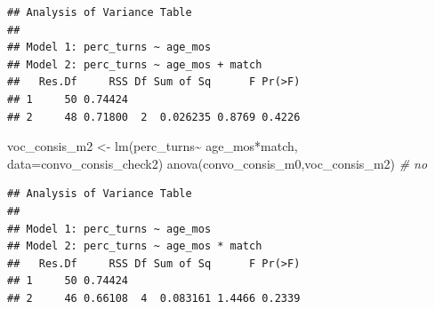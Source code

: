 \documentclass[
]{article}
\newenvironment{Shaded}{\begin{snugshade}}{\end{snugshade}}
\newcommand{\AttributeTok}[1]{\textcolor[rgb]{0.77,0.63,0.00}{#1}}
\newcommand{\CommentTok}[1]{\textcolor[rgb]{0.56,0.35,0.01}{\textit{#1}}}
\newcommand{\FunctionTok}[1]{\textcolor[rgb]{0.00,0.00,0.00}{#1}}
\newcommand{\NormalTok}[1]{#1}
\newcommand{\OtherTok}[1]{\textcolor[rgb]{0.56,0.35,0.01}{#1}}
\newcommand{\SpecialCharTok}[1]{\textcolor[rgb]{0.00,0.00,0.00}{#1}}
\newcommand{\StringTok}[1]{\textcolor[rgb]{0.31,0.60,0.02}{#1}}
\begin{document}
\begin{Shaded}
\end{Shaded}

\begin{verbatim}
## Analysis of Variance Table
## 
## Model 1: perc_turns ~ age_mos
## Model 2: perc_turns ~ age_mos + match
##   Res.Df     RSS Df Sum of Sq      F Pr(>F)
## 1     50 0.74424                           
## 2     48 0.71800  2  0.026235 0.8769 0.4226
\end{verbatim}

\begin{Shaded}
\begin{Highlighting}[]
\NormalTok{voc\_consis\_m2 }\OtherTok{\textless{}{-}} \FunctionTok{lm}\NormalTok{(perc\_turns}\SpecialCharTok{\textasciitilde{}}\NormalTok{ age\_mos}\SpecialCharTok{*}\NormalTok{match, }\AttributeTok{data=}\NormalTok{convo\_consis\_check2)}
\FunctionTok{anova}\NormalTok{(convo\_consis\_m0,voc\_consis\_m2) }\CommentTok{\# no}
\end{Highlighting}
\end{Shaded}

\begin{verbatim}
## Analysis of Variance Table
## 
## Model 1: perc_turns ~ age_mos
## Model 2: perc_turns ~ age_mos * match
##   Res.Df     RSS Df Sum of Sq      F Pr(>F)
## 1     50 0.74424                           
## 2     46 0.66108  4  0.083161 1.4466 0.2339
\end{verbatim}
\end{document}
